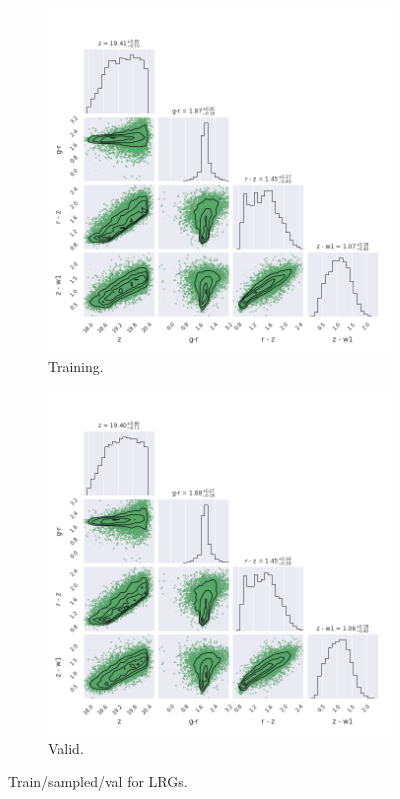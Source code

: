 \begin{figure}
\centering
\begin{subfigure}[b]{.5\textwidth}
  \centering
  \includegraphics[width=\textwidth]{images/gmm/lrgDev_training.png}
  \caption{Training.}
  \label{fig:lrg_train}
\end{subfigure}%
\begin{subfigure}[b]{.5\textwidth}
  \centering
  \includegraphics[width=\textwidth]{images/gmm/lrgDev_valid.png}
  \caption{Valid.}
  \label{fig:lrg_valid}
\end{subfigure}
\caption{Train/sampled/val for LRGs.}
\label{fig:lrg_gmm}
\end{figure}



